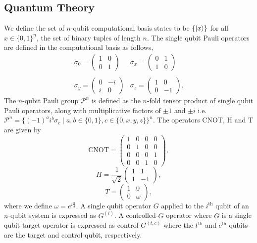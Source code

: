 \documentclass{article}
\theoremstyle{definition}
\theoremstyle{problem}
\theoremstyle{lemma}
\begin{document}
		\subsection{Quantum Theory}
		We define the set of $n$-qubit computational basis states to be $\{\left\vert{x}\right\rangle\}$ for all $x \in \{0,1\}^n$, the set of binary tuples of length $n$.		
		The single qubit Pauli operators are defined in the computational basis as follows,
		\begin{equation}
		\label{e1_Paulis}
		\begin{matrix}
		\sigma_0 = \begin{pmatrix}1 & 0 \\ 0 & 1\end{pmatrix} & \sigma_x = \begin{pmatrix}0 & 1 \\ 1 & 0\end{pmatrix} \\
		& \\
		\sigma_y = \begin{pmatrix}0 & -i \\ i & 0\end{pmatrix} & \sigma_z = \begin{pmatrix}1 & 0 \\ 0 & -1\end{pmatrix}.
		\end{matrix}
		\end{equation}
		The $n$-qubit Pauli group $\mathcal{P}^n$ is defined as the $n$-fold tensor product of single qubit Pauli operators, along with multiplicative factors of $\pm1$ and $\pm i$ i.e. $\mathcal{P}^n = \{\left(-1\right)^a i^b \sigma_c \mid a,b \in \{0,1\}, c \in\{0,x,y,z\}\}^n$.	
		The operators CNOT, H and T are given by
		\begin{equation}
		\label{e2_CNOT}
		\text{CNOT} = \begin{pmatrix}
		1 & 0 & 0 & 0 \\
		0 & 1 & 0 & 0 \\
		0 & 0 & 0 & 1 \\
		0 & 0 & 1 & 0
		\end{pmatrix},
		\end{equation}
		\begin{equation}
		\label{e3_H}
		H = \frac{1}{\sqrt{2}}\begin{pmatrix}
		1 & 1 \\
		1 & -1
		\end{pmatrix},
		\end{equation}
		\begin{equation}
		\label{e4_T}
		T = \begin{pmatrix}
		1 & 0 \\
		0 & \omega
		\end{pmatrix},
		\end{equation}
		where we define $\omega=e^{i\frac{\pi}{4}}$. A single qubit operator $G$ applied to the $i^\text{th}$ qubit of an $n$-qubit system is expressed as $G^{\left(i\right)}$. A controlled-$G$ operator where $G$ is a single qubit target operator is expressed as $\text{control-}G^{\left(t,c\right)}$ where the $t^\text{th}$ and $c^\text{th}$ qubits are the target and control qubit, respectively.
		
\end{document}
